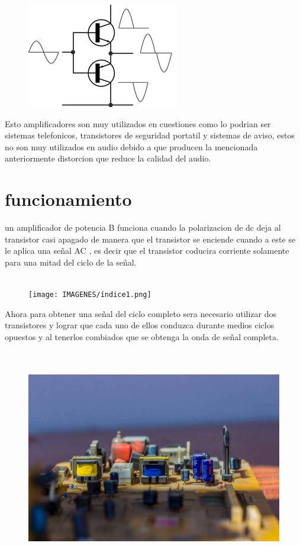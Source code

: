 \documentclass[13pt]{article}
\begin{document}
\begin{figure}[htp]
\centering
\includegraphics[scale=0.50]{IMAGENES/250px-Electronic_Amplifier_Push-pull.png}
\caption{}
\label{}
\end{figure}


Esto amplificadores son muy utilizados en cuestiones como lo podrian ser sistemas telefonicos, transistores de seguridad portatil y sistemas de aviso, estos no son muy utilizados en audio debido a que producen la mencionada anteriormente distorcion que reduce la calidad del audio.


\section{funcionamiento}

un amplificador de potencia B funciona cuando la polarizacion de dc deja al transistor casi apagado  de manera que el transistor se enciende cuando a este se le aplica una señal AC , es decir que el transistor coducira corriente solamente para una mitad del ciclo de la señal.\\\\

\begin{figure}[htp]
\centering
\texttt{[image: IMAGENES/índice1.png]}
\caption{}
\label{}
\end{figure}

Ahora para obtener una señal  del ciclo completo sera necesario utilizar dos transistores y lograr que cada uno de ellos conduzca durante medios ciclos opuestos y al tenerlos combiados que se obtenga la onda de señal completa.\\\\\\
\begin{figure}[htp]
\centering
\includegraphics[scale=0.40]{IMAGENES/electronica-1024x683.jpg}
\caption{}
\label{}
\end{figure}
\end{document}
